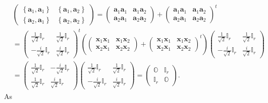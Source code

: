 \documentclass[aps, preprint]{revtex4}
\begin{document}
\begin{align} & \left (\begin{array}{cc}\left \{\mathbf{a}_{1} ,\mathbf{a}_{1}\right \} & \left \{\mathbf{a}_{1} ,\mathbf{a}_{2}\right \} \\
\left \{\mathbf{a}_{2} ,\mathbf{a}_{1}\right \} & \left \{\mathbf{a}_{2} ,\mathbf{a}_{2}\right \}\end{array}\right ) =\left (\begin{array}{cc}\mathbf{a}_{1} \mathbf{a}_{1} & \mathbf{a}_{1} \mathbf{a}_{2} \\
\mathbf{a}_{2} \mathbf{a}_{1} & \mathbf{a}_{2} \mathbf{a}_{2}\end{array}\right ) +\left (\begin{array}{cc}\mathbf{a}_{1} \mathbf{a}_{1} & \mathbf{a}_{1} \mathbf{a}_{2} \\
\mathbf{a}_{2} \mathbf{a}_{1} & \mathbf{a}_{2} \mathbf{a}_{2}\end{array}\right )^{t} \nonumber  \\
 &  =\left (\begin{array}{cc}\frac{1}{\sqrt{2}} \mathbb{I}_{r} & \frac{1}{\sqrt{2}} \mathbb{I}_{r} \\
 -\frac{i}{\sqrt{2}} \mathbb{I}_{r} & \frac{i}{\sqrt{2}} \mathbb{I}_{r}\end{array}\right )^{t} \left (\left (\begin{array}{cc}\mathbf{x}_{1} \mathbf{x}_{1} & \mathbf{x}_{1} \mathbf{x}_{2} \\
\mathbf{x}_{2} \mathbf{x}_{1} & \mathbf{x}_{2} \mathbf{x}_{2}\end{array}\right ) +\left (\begin{array}{cc}\mathbf{x}_{1} \mathbf{x}_{1} & \mathbf{x}_{1} \mathbf{x}_{2} \\
\mathbf{x}_{2} \mathbf{x}_{1} & \mathbf{x}_{2} \mathbf{x}_{2}\end{array}\right )^{t}\right ) \left (\begin{array}{cc}\frac{1}{\sqrt{2}} \mathbb{I}_{r} & \frac{1}{\sqrt{2}} \mathbb{I}_{r} \\
 -\frac{i}{\sqrt{2}} \mathbb{I}_{r} & \frac{i}{\sqrt{2}} \mathbb{I}_{r}\end{array}\right ) \nonumber  \\
 &  =\left (\begin{array}{cc}\frac{1}{\sqrt{2}} \mathbb{I}_{r} &  -\frac{i}{\sqrt{2}} \mathbb{I}_{r} \\
\frac{1}{\sqrt{2}} \mathbb{I}_{r} & \frac{i}{\sqrt{2}} \mathbb{I}_{r}\end{array}\right ) \left (\begin{array}{cc}\frac{1}{\sqrt{2}} \mathbb{I}_{r} & \frac{1}{\sqrt{2}} \mathbb{I}_{r} \\
 -\frac{i}{\sqrt{2}} \mathbb{I}_{r} & \frac{i}{\sqrt{2}} \mathbb{I}_{r}\end{array}\right ) =\left (\begin{array}{cc}\mathbb{O} & \mathbb{I}_{r} \\
\mathbb{I}_{r} & \mathbb{O}\end{array}\right )\text{.}\end{align}As
\end{document}
